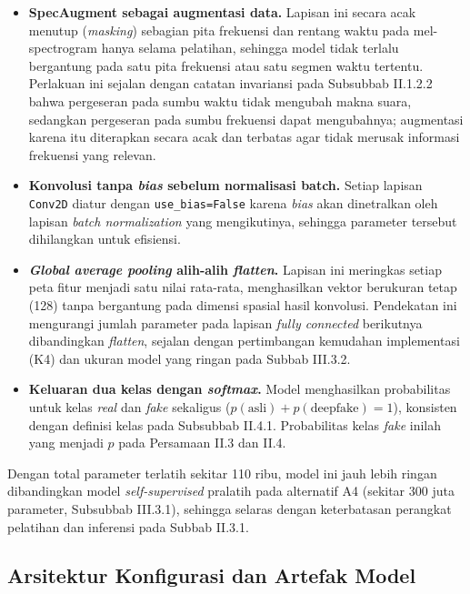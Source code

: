 \begin{itemize}
  \item \textbf{SpecAugment sebagai augmentasi data.} Lapisan ini secara acak
  menutup (\textit{masking}) sebagian pita frekuensi dan rentang waktu pada
  mel-spectrogram hanya selama pelatihan, sehingga model tidak terlalu bergantung
  pada satu pita frekuensi atau satu segmen waktu tertentu. Perlakuan ini sejalan
  dengan catatan invariansi pada Subsubbab II.1.2.2 bahwa pergeseran pada sumbu
  waktu tidak mengubah makna suara, sedangkan pergeseran pada sumbu frekuensi
  dapat mengubahnya; augmentasi karena itu diterapkan secara acak dan terbatas agar
  tidak merusak informasi frekuensi yang relevan.
  \item \textbf{Konvolusi tanpa \textit{bias} sebelum normalisasi batch.} Setiap
  lapisan \texttt{Conv2D} diatur dengan \texttt{use\_bias=False} karena
  \textit{bias} akan dinetralkan oleh lapisan \textit{batch normalization} yang
  mengikutinya, sehingga parameter tersebut dihilangkan untuk efisiensi.
  \item \textbf{\textit{Global average pooling} alih-alih \textit{flatten}.} Lapisan
  ini meringkas setiap peta fitur menjadi satu nilai rata-rata, menghasilkan vektor
  berukuran tetap (128) tanpa bergantung pada dimensi spasial hasil konvolusi.
  Pendekatan ini mengurangi jumlah parameter pada lapisan \textit{fully connected}
  berikutnya dibandingkan \textit{flatten}, sejalan dengan pertimbangan kemudahan
  implementasi (K4) dan ukuran model yang ringan pada Subbab III.3.2.
  \item \textbf{Keluaran dua kelas dengan \textit{softmax}.} Model menghasilkan
  probabilitas untuk kelas \textit{real} dan \textit{fake} sekaligus
  ($p(\text{asli})+p(\text{deepfake})=1$), konsisten dengan definisi kelas pada
  Subsubbab II.4.1. Probabilitas kelas \textit{fake} inilah yang menjadi $p$ pada
  Persamaan II.3 dan II.4.
\end{itemize}

Dengan total parameter terlatih sekitar 110 ribu, model ini jauh lebih ringan
dibandingkan model \textit{self-supervised} pralatih pada alternatif A4 (sekitar
300 juta parameter, Subsubbab III.3.1), sehingga selaras dengan keterbatasan
perangkat pelatihan dan inferensi pada Subbab II.3.1.

\subsection{Arsitektur Konfigurasi dan Artefak Model}
\label{subsec:arsitektur-konfigurasi}

